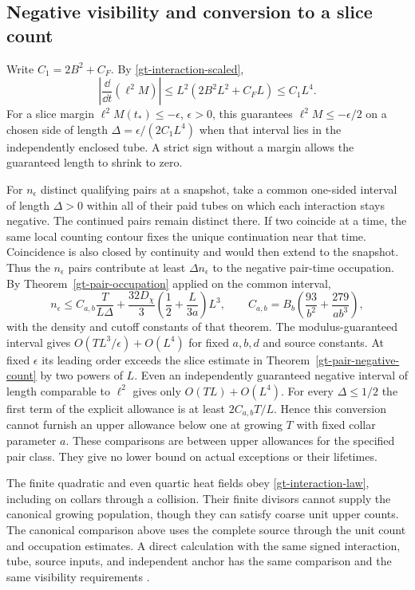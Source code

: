 \subsection{Negative visibility and conversion to a slice count}

Write \(C_1=2B^2+C_F\). By \eqref{gt-interaction-scaled},
\[
 \left|\frac{\dd}{\dd t}(\ell^2M)\right|
 \le L^2(2B^2L^2+C_FL)\le C_1L^4 .
\]
For a slice margin \(\ell^2M(t_*)\le-\epsilon\), \(\epsilon>0\),
this guarantees \(\ell^2M\le-\epsilon/2\) on a chosen side of length
\(\Delta=\epsilon/(2C_1L^4)\) when that interval lies in the
independently enclosed tube. A strict sign without a margin allows
the guaranteed length to shrink to zero.

For \(n_\epsilon\) distinct qualifying pairs at a snapshot, take
a common one-sided interval of length \(\Delta>0\) within all of
their paid tubes on which each interaction stays negative. The
continued pairs remain distinct there. If two coincide at a time,
the same local counting contour fixes the unique continuation near
that time. Coincidence is also closed by continuity and would then
extend to the snapshot. Thus the \(n_\epsilon\) pairs contribute at
least \(\Delta n_\epsilon\) to the negative pair-time occupation.
By Theorem~\ref{gt-pair-occupation} applied on the common interval,
\begin{equation}
 n_\epsilon\le C_{a,b}\frac{T}{L\Delta}
       +\frac{32D_\chi}{3}\left(\frac12+\frac{L}{3a}\right)L^3,
 \qquad C_{a,b}=B_b\left(\frac{93}{b^2}+\frac{279}{ab^3}\right),
 \label{gt-visibility-comparison}
\end{equation}
with the density and cutoff constants of that theorem. The
modulus-guaranteed interval gives \(O(TL^3/\epsilon)+O(L^4)\)
for fixed \(a,b,d\) and source constants. At fixed \(\epsilon\)
its leading order exceeds the slice estimate in
Theorem~\ref{gt-pair-negative-count} by two powers of \(L\).
Even an independently guaranteed negative interval of length
comparable to \(\ell^2\) gives only \(O(TL)+O(L^4)\).
For every \(\Delta\le1/2\) the first term of the explicit allowance
is at least \(2C_{a,b}T/L\). Hence this conversion cannot furnish an
upper allowance below one at growing \(T\) with fixed collar parameter
\(a\). These comparisons are between upper allowances for the
specified pair class. They give no lower bound on actual exceptions
or their lifetimes.

The finite quadratic and even quartic heat fields obey
\eqref{gt-interaction-law}, including on collars through a collision.
Their finite divisors cannot supply the canonical growing population,
though they can satisfy coarse unit upper counts. The canonical
comparison above uses the complete source through the unit count
and occupation estimates. A direct calculation with the same
signed interaction, tube, source inputs, and independent anchor
has the same comparison and the same visibility requirements
\cite{gtdynamics}.
